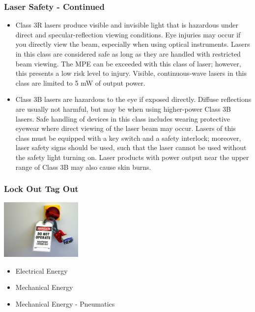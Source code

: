 \documentclass{beamer}
\begin{document}
\begin{frame}\frametitle{Laser Safety - Continued}
\begin{itemize}
\item Class 3R lasers produce visible and invisible light that is hazardous under direct and specular-reflection viewing conditions. Eye injuries may occur if you directly view the beam, especially when using optical instruments. Lasers in this class are considered safe as long as they are handled with restricted beam viewing. The MPE can be exceeded with this class of laser; however, this presents a low risk level to injury. Visible, continuous-wave lasers in this class are limited to 5 mW of output power.
\item Class 3B lasers are hazardous to the eye if exposed directly. Diffuse reflections are usually not harmful, but may be when using higher-power Class 3B lasers. Safe handling of devices in this class includes wearing protective eyewear where direct viewing of the laser beam may occur. Lasers of this class must be equipped with a key switch and a safety interlock; moreover, laser safety signs should be used, such that the laser cannot be used without the safety light turning on. Laser products with power output near the upper range of Class 3B may also cause skin burns.
\end{itemize}

\end{frame}


\begin{frame}\frametitle{Lock Out Tag Out}
\begin{center}
\includegraphics[width=4cm]{fig/loto.jpg}
\end{center}

\begin{itemize}
\item Electrical Energy
\item Mechanical Energy
\item Mechanical Energy - Pneumatics
\end{itemize}
\end{frame}
\end{document}
